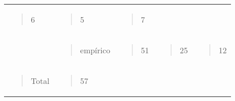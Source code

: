 \begin{longtable}[]{@{}lllll@{}}
\begin{minipage}[t]{0.19\columnwidth}
\begin{quote}
6
\end{quote}\strut
\end{minipage} & \begin{minipage}[t]{0.19\columnwidth}\raggedright\strut
\begin{quote}
5
\end{quote}\strut
\end{minipage} & \begin{minipage}[t]{0.19\columnwidth}\raggedright\strut
\begin{quote}
7
\end{quote}\strut
\end{minipage}\tabularnewline
\begin{minipage}[t]{0.19\columnwidth}\raggedright\strut
\strut
\end{minipage} & \begin{minipage}[t]{0.19\columnwidth}\raggedright\strut
\begin{quote}
empírico
\end{quote}\strut
\end{minipage} & \begin{minipage}[t]{0.19\columnwidth}\raggedright\strut
\begin{quote}
51
\end{quote}\strut
\end{minipage} & \begin{minipage}[t]{0.19\columnwidth}\raggedright\strut
\begin{quote}
25
\end{quote}\strut
\end{minipage} & \begin{minipage}[t]{0.19\columnwidth}\raggedright\strut
\begin{quote}
12
\end{quote}\strut
\end{minipage}\tabularnewline
\begin{minipage}[t]{0.19\columnwidth}\raggedright\strut
\begin{quote}
Total
\end{quote}\strut
\end{minipage} & \begin{minipage}[t]{0.19\columnwidth}\raggedright\strut
\begin{quote}
57
\end{quote}\strut
\end{minipage} & \begin{minipage}[t]{0.19\columnwidth}\raggedright\strut

\end{minipage}
\end{longtable}
